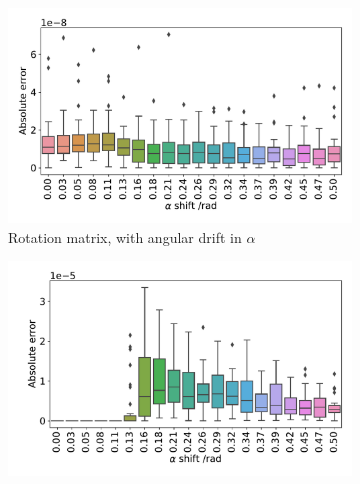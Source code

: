 \documentclass{osa-article}
\begin{document}



\begin{figure}
  \centering
  \begin{subfigure}[t]{0.5\linewidth}
    \captionsetup{width=0.8\linewidth}
    \centering
    \includegraphics[width=\linewidth]{./figures/results/helix/decompose/improved/10082020_bead_simulation_alpha_ROT_err}
    \caption{Rotation matrix, with angular drift in \(\alpha \)}\label{fig:pc_sum_rot_alpha}
  \end{subfigure}\hfill
  \begin{subfigure}[t]{0.5\linewidth}
    \captionsetup{width=0.8\linewidth}
    \centering
    \includegraphics[width=\linewidth]{./figures/results/helix/decompose/improved/10082020_bead_simulation_alpha_TRANS_err}

\end{subfigure}
\end{figure}
\end{document}

